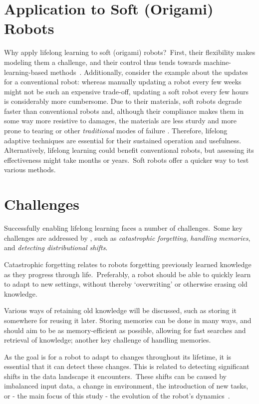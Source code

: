 \section{Application to Soft (Origami) Robots}\label{sec:origami}
Why apply lifelong learning to soft (origami) robots?\ First, their flexibility makes modeling them a challenge, and their control thus tends towards machine-learning-based methods~\cite{Kim2021}.
Additionally, consider the example about the updates for a conventional robot:
whereas manually updating a robot every few weeks might not be such an expensive trade-off, updating a soft robot every few hours is considerably more cumbersome.
Due to their materials, soft robots degrade faster than conventional robots and, although their compliance makes them in some way more resistive to damages, the materials are less sturdy and more prone to tearing or other \emph{traditional} modes of failure .
Therefore, lifelong adaptive techniques are essential for their sustained operation and usefulness.
Alternatively, lifelong learning could benefit conventional robots, but assessing its effectiveness might take months or years.\ Soft robots offer a quicker  way to test various methods.


\section{Challenges}\label{sec:challenges}
Successfully enabling lifelong learning faces a number of challenges.\ Some key challenges are addressed by \textcite{Lesort2020}, such as \emph{catastrophic forgetting}, \emph{handling memories}, and \emph{detecting distributional shifts}.

Catastrophic forgetting relates to robots forgetting previously learned knowledge as they progress through life.\ Preferably, a robot should be able to quickly learn to adapt to new settings, without thereby `overwriting' or otherwise erasing old knowledge.

Various ways of retaining old knowledge will be discussed, such as storing it somewhere for reusing it later.
Storing memories can be done in many ways, and should aim to be as memory-efficient as possible, allowing for fast searches and retrieval of knowledge; another key challenge of handling memories.

As the goal is for a robot to adapt to changes throughout its lifetime, it is essential that it can detect these changes.
This is related to detecting significant shifts in the data landscape it encounters.\ These shifts can be caused by imbalanced input data, a change in environment, the introduction of new tasks, or - the main focus of this study - the evolution of the robot's dynamics~\cite{Lesort2020}.


